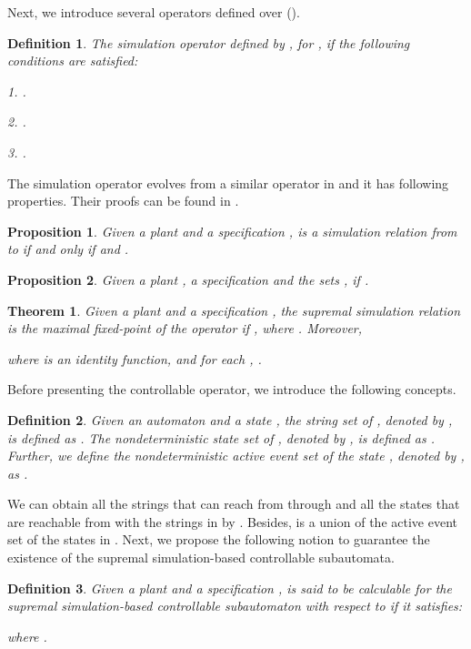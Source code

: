 \documentclass[12pt,draftcls,onecolumn]{IEEEtran}
\newtheorem{Theorem}{Theorem}
\newtheorem{Proposition}{Proposition}
\newtheorem{Definition}{Definition}
\begin{document}
Next, we introduce several operators defined over ().



\begin{Definition}
The simulation operator  defined by
, for , if the following
conditions are satisfied:

1. .

2.    .

3.   .
\end{Definition}

The simulation operator evolves from a similar operator in
\cite{pov} and it has following properties. Their proofs can be
found in \cite{sun}.


\begin{Proposition}\label{ss}
Given a plant  and a specification
,  is a simulation relation
from  to  if and only if  and .
\end{Proposition}

\begin{Proposition}\label{sm}
Given a plant , a specification
 and the sets ,  if .
\end{Proposition}

















\begin{Theorem} \label{st}
Given a plant  and a
specification , the supremal
simulation relation is the maximal fixed-point  of the operator
 if , where .
Moreover,

where  is an identity function,
and for each , .
\end{Theorem}






Before presenting the controllable operator, we introduce the
following concepts.
\begin{Definition}
Given an automaton  and a state , the string set of , denoted
by , is defined as . The nondeterministic state set of , denoted
by , is defined as . Further, we define the
nondeterministic active event set of the state , denoted by
, as .
\end{Definition}

We can obtain all the strings that can reach  from  through
 and all the states that are reachable from  with the
strings in  by . Besides,  is a union
of the active event set of the states in . Next, we propose
the following notion to guarantee the existence of the supremal
simulation-based controllable subautomata.
\begin{Definition}
Given a plant  and a specification
,  is said to be calculable for
the supremal simulation-based controllable subautomaton with respect
to  if it satisfies:

where .
\end{Definition}
\end{document}

